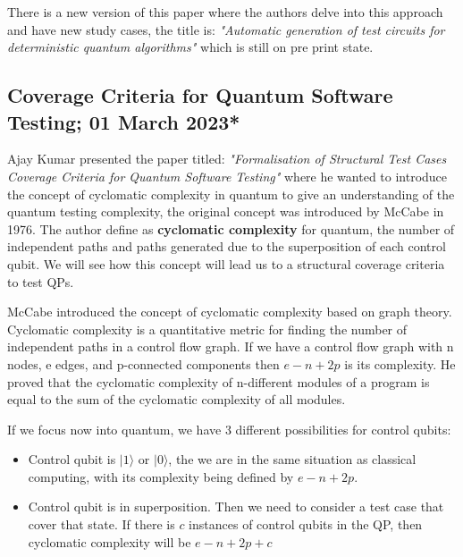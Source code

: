 \begin{itemize}
There is a new version of this paper where the authors delve into this approach and have new study cases, the title is: \textit{"Automatic generation of test circuits for deterministic quantum algorithms"} \cite{garcia4421955automatic} which is still on pre print state.

\vspace{15pt}
\subsection{Coverage Criteria for Quantum Software Testing; 01 March 2023*}

Ajay Kumar presented the paper titled: \textit{"Formalisation of Structural Test Cases Coverage Criteria for Quantum Software Testing"} \cite{kumar2023formalization} where he wanted to introduce the concept of cyclomatic complexity in quantum to give an understanding of the quantum testing complexity, the original concept was introduced by McCabe in 1976\cite{mccabe1976complexity}. The author define as \textbf{cyclomatic complexity} for quantum, the number of independent paths and paths generated due to the superposition of each control qubit. We will see how this concept will lead us to a structural coverage criteria to test QPs.\newline

McCabe\cite{mccabe1976complexity} introduced the concept of cyclomatic complexity based on graph theory. Cyclomatic complexity is a quantitative metric for finding the number of independent paths in a control flow graph. If we have a control flow graph with n nodes, e edges, and p-connected components then $e-n+2p$ is its complexity. He proved that the cyclomatic complexity of n-different modules of a program is equal to the sum of the cyclomatic complexity of all modules.\newline

If we focus now into quantum, we have 3 different possibilities for control qubits:

\begin{itemize}
    \item Control qubit is $|1\rangle$ or $|0\rangle$, the we are in the same situation as classical computing, with its complexity being defined by $e-n+2p$.
    \item Control qubit is in superposition. Then we need to consider a test case that cover that state. If there is $c$ instances of control qubits in the QP, then cyclomatic complexity will be $e-n+2p+c$
\end{itemize}


\end{itemize}
